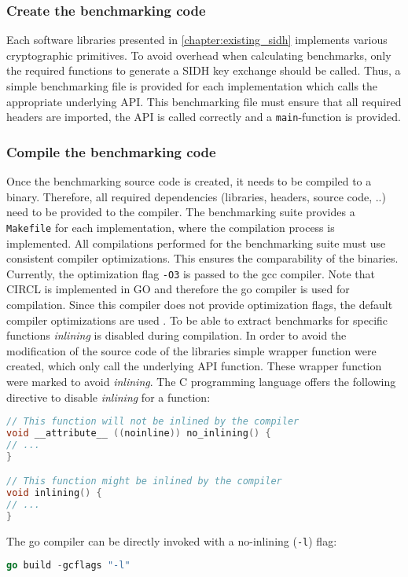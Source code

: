 \subsubsection{Create the benchmarking code}
Each software libraries presented in \autoref{chapter:existing_sidh} implements various cryptographic primitives. To avoid overhead when calculating benchmarks, only the required functions to generate a \gls{SIDH} key exchange should be called. Thus, a simple benchmarking file is provided for each implementation which calls the appropriate underlying API. This benchmarking file must ensure that all required headers are imported, the API is called correctly and a \texttt{main}-function is provided.

\subsubsection{Compile the benchmarking code}
Once the benchmarking source code is created, it needs to be compiled to a binary. Therefore, all required dependencies (libraries, headers, source code, ..) need to be provided to the compiler. The benchmarking suite provides a \texttt{Makefile} for each implementation, where the compilation process is implemented.
All compilations performed for the benchmarking suite must use consistent compiler optimizations. This ensures the comparability of the binaries. Currently, the optimization flag \texttt{-O3} is passed to the gcc compiler. Note that CIRCL is implemented in GO and therefore the go compiler is used for compilation. Since this compiler does not provide optimization flags, the default compiler optimizations are used \parencite{gowiki2020compiler}.
To be able to extract benchmarks for specific functions \textit{inlining} is disabled during compilation. In order to avoid the modification of the source code of the libraries simple wrapper function were created, which only call the underlying API function. These wrapper function were marked to avoid \textit{inlining}. The C programming language offers the following directive to disable \textit{inlining} for a function:
\begin{lstlisting}[language=C]
// This function will not be inlined by the compiler
void __attribute__ ((noinline)) no_inlining() {
// ...
}

// This function might be inlined by the compiler
void inlining() {
// ...
}
\end{lstlisting}
The go compiler can be directly invoked with a no-inlining (\texttt{-l}) flag:
\begin{lstlisting}[language=Go]
go build -gcflags "-l"
\end{lstlisting}

